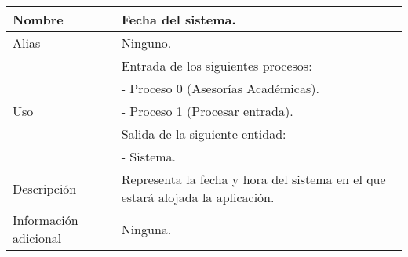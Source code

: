 \begin{center}
  \begin{tabular}{| l | p{9cm} |}
    \hline
    Nombre & \textbf{Fecha del sistema}.\\
    \hline
    Alias & Ninguno.\\
    \hline
    \multirow{5}{*}{Uso} & Entrada de los siguientes procesos:\\
                         & - Proceso 0 (Asesorías Académicas).\\
                         & - Proceso 1 (Procesar entrada).\\
                         & Salida de la siguiente entidad:\\
                         & - Sistema.\\
    \hline
    Descripción & Representa la fecha y hora del sistema en el que estará
                  alojada la aplicación.\\
    \hline
    Información adicional & Ninguna.\\
    \hline
  \end{tabular}
\end{center}
